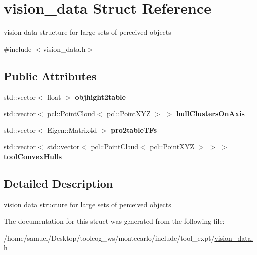 \hypertarget{structvision__data}{}\section{vision\+\_\+data Struct Reference}
\label{structvision__data}


vision data structure for large sets of perceived objects  




{\ttfamily \#include $<$vision\+\_\+data.\+h$>$}

\subsection*{Public Attributes}
\begin{DoxyCompactItemize}
\item 
\mbox{\label{structvision__data_a95115b1fce74123383b6c4472745448b}} 
std\+::vector$<$ float $>$ {\bfseries objhight2table}
\item 
\mbox{\label{structvision__data_a1bdd2b23e155c994219099b27a5b486f}} 
std\+::vector$<$ pcl\+::\+Point\+Cloud$<$ pcl\+::\+Point\+X\+YZ $>$ $>$ {\bfseries hull\+Clusters\+On\+Axis}
\item 
\mbox{\label{structvision__data_a2e3628a452aa67ad21669ae1feeadc7d}} 
std\+::vector$<$ Eigen\+::\+Matrix4d $>$ {\bfseries pro2table\+T\+Fs}
\item 
\mbox{\label{structvision__data_a71bb8dcc2cfb218345063d77b3208f5f}} 
std\+::vector$<$ std\+::vector$<$ pcl\+::\+Point\+Cloud$<$ pcl\+::\+Point\+X\+YZ $>$ $>$ $>$ {\bfseries tool\+Convex\+Hulls}
\end{DoxyCompactItemize}


\subsection{Detailed Description}
vision data structure for large sets of perceived objects 

The documentation for this struct was generated from the following file\+:\begin{DoxyCompactItemize}
\item 
/home/samuel/\+Desktop/toolcog\+\_\+ws/montecarlo/include/tool\+\_\+expt/\hyperlink{vision__data_8h}{vision\+\_\+data.\+h}\end{DoxyCompactItemize}
